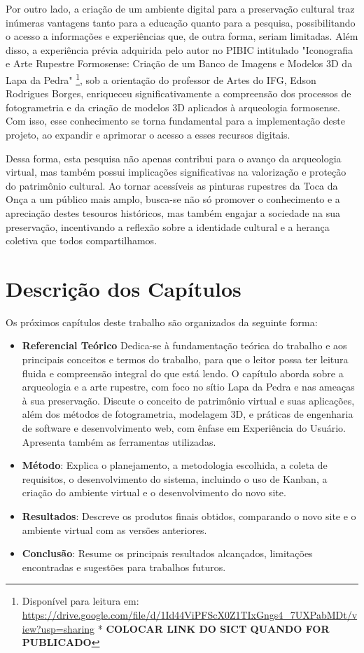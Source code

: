 Por outro lado, a criação de um ambiente digital para a preservação cultural traz inúmeras vantagens tanto para a educação quanto para a pesquisa, possibilitando o acesso a informações e experiências que, de outra forma, seriam limitadas. Além disso, a experiência prévia adquirida pelo autor no \gls{PIBIC} intitulado "Iconografia e Arte Rupestre Formosense: Criação de um Banco de Imagens e Modelos \gls{3D} da Lapa da Pedra" \footnote{Disponível para leitura em: 
\href{https://drive.google.com/file/d/1Id44ViPFScX0Z1TIxGngs4_7UXPabMDt/view?usp=sharing}{https://drive.google.com/file/d/1Id44ViPFScX0Z1TIxGngs4_7UXPabMDt/view?usp=sharing} *\textbf{ COLOCAR LINK DO SICT QUANDO FOR PUBLICADO}}, sob a orientação do professor de Artes do \gls{IFG}, Edson Rodrigues Borges, enriqueceu significativamente a compreensão dos processos de fotogrametria e da criação de modelos \gls{3D} aplicados à arqueologia formosense. Com isso, esse conhecimento se torna fundamental para a implementação deste projeto, ao expandir e aprimorar o acesso a esses recursos digitais.

Dessa forma, esta pesquisa não apenas contribui para o avanço da arqueologia virtual, mas também possui implicações significativas na valorização e proteção do patrimônio cultural. Ao tornar acessíveis as pinturas rupestres da Toca da Onça a um público mais amplo, busca-se não só promover o conhecimento e a apreciação destes tesouros históricos, mas também engajar a sociedade na sua preservação, incentivando a reflexão sobre a identidade cultural e a herança coletiva que todos compartilhamos.

\section{Descrição dos Capítulos}
Os próximos capítulos deste trabalho são organizados da seguinte forma:
\begin{itemize}
    \item \textbf{Referencial Teórico}
    Dedica-se à fundamentação teórica do trabalho e aos principais conceitos e termos do trabalho, para que o leitor possa ter leitura fluida e compreensão integral do que está lendo. O capítulo aborda sobre a arqueologia e a arte rupestre, com foco no sítio Lapa da Pedra e nas ameaças à sua preservação. Discute o conceito de patrimônio virtual e suas aplicações, além dos métodos de fotogrametria, modelagem \gls{3D}, e práticas de engenharia de software e desenvolvimento web, com ênfase em Experiência do Usuário. Apresenta também as ferramentas utilizadas.
    \item \textbf{Método}: Explica o planejamento, a metodologia escolhida, a coleta de requisitos, o desenvolvimento do sistema, incluindo o uso de Kanban, a criação do ambiente virtual e o desenvolvimento do novo site.
    \item \textbf{Resultados}: Descreve os produtos finais obtidos, comparando o novo site e o ambiente virtual com as versões anteriores.
    \item \textbf{Conclusão}: Resume os principais resultados alcançados, limitações encontradas e sugestões para trabalhos futuros.
\end{itemize}

